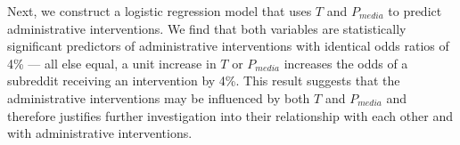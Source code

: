  Next, we construct a logistic regression model that uses $T$
and $P_{media}$ to predict administrative interventions. We find that both
variables are statistically significant predictors of administrative
interventions with identical odds ratios of 4\% --- \ie all else equal, a unit
increase in $T$ or $P_{media}$ increases the odds of a subreddit receiving an
intervention by 4\%. This result suggests that the administrative interventions
may be influenced by both $T$ and $P_{media}$ and therefore justifies further
investigation into their relationship with each other and with administrative
interventions.

% 
% 
